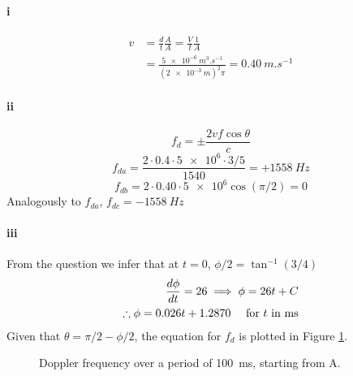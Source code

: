 \paragraph{i}
\begin{equation}
    \begin{split}
        v &= \frac{d}{t} \frac{A}{A} = \frac{V}{t}\frac{1}{A} \\
          &= \frac{ \SI{5e-6}{m^3.s^{-1}} }{ {(\SI{2e-3}{m})}^2 \pi } = \SI{0.40}{m.s^{-1}}
    \end{split}
\end{equation}

\paragraph{ii}
\begin{equation}
    f_{d} = \pm \frac{ 2vf \cos \theta }{ c }
\end{equation}
\begin{equation*}
    f_{da} = \frac{ 2\cdot 0.4 \cdot \num{5e6} \cdot 3/5 }{ 1540 } = +\SI{1558}{Hz}
\end{equation*}
\begin{equation*}
    f_{db} = 2 \cdot 0.40 \cdot \num{5e6} \cos(\pi/2) = 0
\end{equation*}
Analogously to $f_{da}$, $f_{dc} = -\SI{1558}{Hz}$

\paragraph{iii}
From the question we infer that at $t=0$, $\phi/2 = \tan^{-1} (3/4)$
\begin{equation}\begin{split}
    \frac{d\phi}{dt} = 26 \implies \phi = 26t + C\\
    \therefore \phi = 0.026t + 1.2870 \quad \text{ for $t$ in \si{ms}}
\end{split}
\end{equation}
Given that $\theta = \pi/2 - \phi/2 $, the equation for $f_d$ is plotted in Figure \ref{fig:doppler-variation}.

\begin{figure}[h]
    \centering
    \caption{Doppler frequency over a period of \SI{100}{ms}, starting from A.}
    \label{fig:doppler-variation}
\end{figure}

